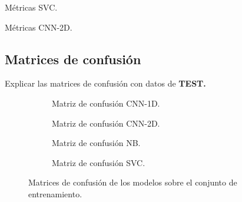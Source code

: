     \begin{table}[H]
      \centering
      \caption{Métricas SVC.}
      \label{SVCDMetrics}
    \end{table}

    \begin{table}[H]
      \centering
      \caption{Métricas CNN-2D.}
      \label{CNN2DMetrics}
    \end{table}

  \subsection{Matrices de confusión}

    Explicar las matrices de confusión con datos de \textbf{TEST.}

    \begin{figure}
        \centering
        \begin{subfigure}[b]{0.4\textwidth}
            \centering
            
            \caption{Matriz de confusión CNN-1D.}
            \label{ConfussionMatrixImages:1D}
        \end{subfigure}
        \begin{subfigure}[b]{0.4\textwidth}
            \centering
            
            \caption{Matriz de confusión CNN-2D.} 
            \label{ConfussionMatrixImages:2D}

        \end{subfigure}
        \begin{subfigure}[b]{0.4\textwidth}
            \centering
            
            \caption{Matriz de confusión NB.}
            \label{ConfussionMatrixImages:NB}
        \end{subfigure}
        \begin{subfigure}[b]{0.4\textwidth}
            \centering
            
            \caption{Matriz de confusión SVC.}
            \label{ConfussionMatrixImages:SVC}
        \end{subfigure}

        \caption{Matrices de confusión de los modelos sobre el conjunto de entrenamiento.}
        \label{ConfussionMatrixImages}
     \end{figure}

